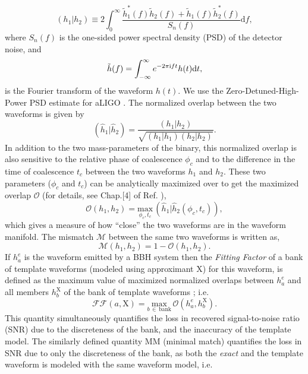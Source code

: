 \documentclass[aps,
prd,
amsmath,
amssymb,
twocolumn,
floatfix,
groupedaddress]{revtex4-1}
\newcommand{\ii}{{\rm i}}
\newcommand{\D}{\mathrm{d}}
\newcommand{\Olap}{\mathcal{O}}
\newcommand{\MM}{\mathrm{MM}}
\newcommand{\X}{\mathrm{X}}
\def\l({\left(}
\def\r){\right)}
\begin{document}
\begin{equation}\label{eq:overlap}
(h_1|h_2) \equiv 2\int^{\infty}_0\dfrac{\tilde{h}_1^*(f)\tilde{h}_2(f) + \tilde{h}_1(f)\tilde{h}_2^*(f)}{S_n(f)}\D f,
\end{equation}
where $S_n(f)$ is the one-sided power spectral density (PSD) of the detector noise, and
\begin{equation}
\tilde{h}(f) = \int^{\infty}_{-\infty}e^{-2\pi\ii ft}h(t)\D t,
\end{equation}
is the Fourier transform of the waveform $h(t)$. We use the Zero-Detuned-High-Power PSD estimate for aLIGO \citep{aLIGONoiseCurve}. The normalized overlap between the two waveforms is given by
\begin{equation}
(\hat{h}_1|\hat{h}_2) = \dfrac{(h_1|h_2)}{\sqrt{(h_1|h_1)(h_2|h_2)}}.
\end{equation}
In addition to the two mass-parameters of the binary, this normalized overlap is also sensitive to the relative phase of coalescence $\phi_c$ and to the difference in the time of coalescence $t_c$ between the two waveforms $h_1$ and $h_2$. These two parameters ($\phi_c$ and $t_c$) can be analytically maximized over to get the maximized overlap $\Olap$ (for details, see Chap.[4] of Ref. \citep{Brown:2004vh}),
\begin{equation}\label{eq:maxnormolap}
\Olap(h_1,h_2) = \underset{\phi_c,t_c}{\mathrm{max}}\,\l(\hat{h}_1|\hat{h}_2(\phi_c,t_c)\r),
\end{equation}
which gives a measure of how ``close'' the two waveforms are in the waveform manifold. The mismatch $\mathcal{M}$ between the same two waveforms is written as,
\begin{equation}\label{eq:mismatch}
\mathcal{M}(h_1,h_2) = 1 - \Olap(h_1,h_2).
\end{equation}
If $h^e_a$ is the waveform emitted by a BBH system then the \textit{Fitting Factor} of a bank of template waveforms (modeled using approximant $\X$) for this waveform, is defined as the maximum value of maximized normalized overlaps between $h^e_a$ and all members $h^{\X}_b$ of the bank of template waveforms \citep{FittingFactorApostolatos}; i.e.
\begin{equation}\label{eq:defFF}
\mathcal{FF}(a,\X) = \underset{b\, \in\, \mathrm{bank}}{\textrm{max}}\,\Olap(h^e_a,h^{\X}_b).
\end{equation}
This quantity simultaneously quantifies the loss in recovered signal-to-noise ratio (SNR) due to the discreteness of the bank, and the inaccuracy of the template model. The similarly defined quantity $\MM$ (minimal match) quantifies the loss in SNR due to only the discreteness of the bank, as both the \textit{exact} and the template waveform is modeled with the same waveform model, i.e.
\end{document}
